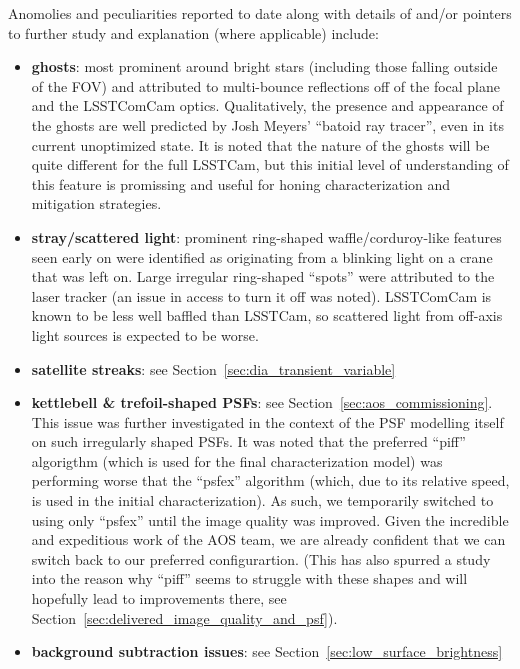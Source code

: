Anomolies and peculiarities reported to date along with details of and/or pointers
to further study and explanation (where applicable) include:
\begin{itemize}

\item \textbf{ghosts}: most prominent around bright stars (including those falling
  outside of the FOV) and attributed to multi-bounce reflections off of the focal
  plane and the LSSTComCam optics.  Qualitatively, the presence and appearance of the ghosts
  are well predicted by Josh Meyers' ``batoid ray tracer'', even in its
  current unoptimized state.  It is noted that the nature of the ghosts will be
  quite different for the full LSSTCam, but this initial level of understanding
  of this feature is promissing and useful for honing characterization and
  mitigation strategies.

\item \textbf{stray/scattered light}: prominent ring-shaped waffle/corduroy-like
  features seen early on were identified as originating from a blinking light on a
  crane that was left on. Large irregular ring-shaped ``spots'' were attributed to
  the laser tracker (an issue in access to turn it off was noted). LSSTComCam is 
  known to be less well baffled than LSSTCam, so scattered light from off-axis light 
  sources is expected to be worse.

\item \textbf{satellite streaks}: see Section~\ref{sec:dia_transient_variable}

\item \textbf{kettlebell \& trefoil-shaped PSFs}: see Section~\ref{sec:aos_commissioning}.
  This issue was further investigated in the context of the PSF modelling itself on such
  irregularly shaped PSFs.  It was noted that the preferred ``piff'' algorigthm (which
  is used for the final characterization model) was performing worse that the ``psfex''
  algorithm (which, due to its relative speed, is used in the initial characterization).
  As such, we temporarily switched to using only ``psfex'' until the image quality was
  improved.  Given the incredible and expeditious work of the AOS team, we are already
  confident that we can switch back to our preferred configurartion.  (This has also
  spurred a study into the reason why ``piff'' seems to struggle with these shapes and
  will hopefully lead to improvements there, see
  Section~\ref{sec:delivered_image_quality_and_psf}).

\item \textbf{background subtraction issues}: see Section~\ref{sec:low_surface_brightness}


\end{itemize}
